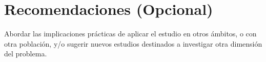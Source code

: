 \chapter{Recomendaciones (Opcional)}

Abordar las implicaciones prácticas de aplicar el estudio en otros ámbitos, o con otra población, y/o sugerir nuevos estudios destinados a investigar otra dimensión del problema.